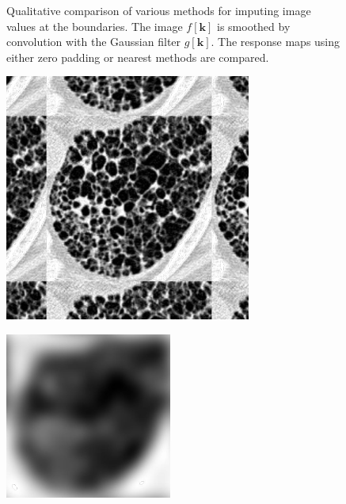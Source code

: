 \documentclass[fleqn,a4paper,oneside,openany]{book}
\begin{document}
\begin{figure}
\begin{minipage}[b]{150pt}
     \label{fig:boundaryConditions1_f}
   \end{minipage}
  \caption{Qualitative comparison of various methods for imputing image values at the boundaries.
  The image $f[\boldsymbol{k}]$ is smoothed by convolution with the Gaussian filter $g[\boldsymbol{k}]$.
  The response maps using either zero padding or nearest methods are compared.
  }
  \label{fig:boundaryConditions1}
\end{figure}

\begin{figure}
\centering
   \begin{minipage}[b]{150pt}
     \centering
     \includegraphics[trim = 0 0 0 0, clip, scale=0.57]{PeriodizeFext_BC.png}
     \label{fig:boundaryConditions2_a}
     \hspace{100pt}
   \end{minipage}
   \begin{minipage}[b]{150pt}
     \centering
     \includegraphics[trim = 0 -34 0 0, clip, scale=0.57]{PeriodizeC_BC.png}
     \label{fig:boundaryConditions2_b}

\end{minipage}
\end{figure}
\end{document}

